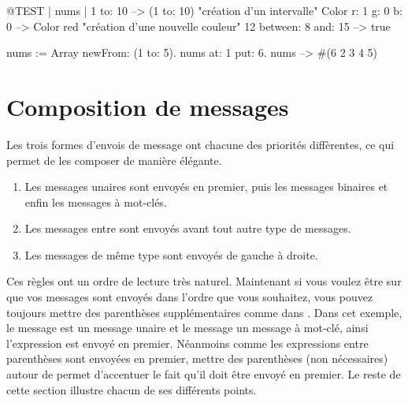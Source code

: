 \documentclass[a4paper,10pt,twoside]{book}
\begin{document}

\begin{code}{@TEST | nums |}
1 to: 10                        --> (1 to: 10)  "cr\'eation d'un intervalle"
Color r: 1 g: 0 b: 0       --> Color red  "cr\'eation d'une nouvelle couleur"
12 between: 8 and: 15 --> true

nums := Array newFrom: (1 to: 5).
nums at: 1 put: 6.
nums --> #(6 2 3 4 5)
\end{code}


\section{Composition de messages}
Les trois formes d'envois de message ont chacune des priorit\'es diff\`erentes, ce qui permet de les composer de mani\`ere \'el\'egante.

\begin{enumerate}
\item Les messages unaires sont envoy\'es en premier, puis les messages binaires et enfin les messages \`a mot-cl\'es.
\item Les messages entre  sont envoy\'es avant tout autre type de messages. 
\item Les messages de m\^eme type sont envoy\'es de gauche \`a droite. 
\end{enumerate}

Ces r\`egles ont un ordre de lecture tr\`es naturel. Maintenant si vous voulez \^etre sur que vos messages sont envoy\'es dans l'ordre que vous souhaitez, vous pouvez toujours mettre des parenth\`eses suppl\'ementaires comme dans . Dans cet exemple, le message  est un message unaire et le message un message \`a mot-cl\'e, ainsi l'expression  est envoy\'e en premier. N\'eanmoins comme les expressions entre parenth\`eses sont envoy\'ees en premier, mettre des parenth\`eses (non n\'ecessaires) autour de  permet d'accentuer le fait qu'il doit \^etre envoy\'e en premier. Le reste de cette section illustre chacun de ses diff\'erents points.
\end{document}

